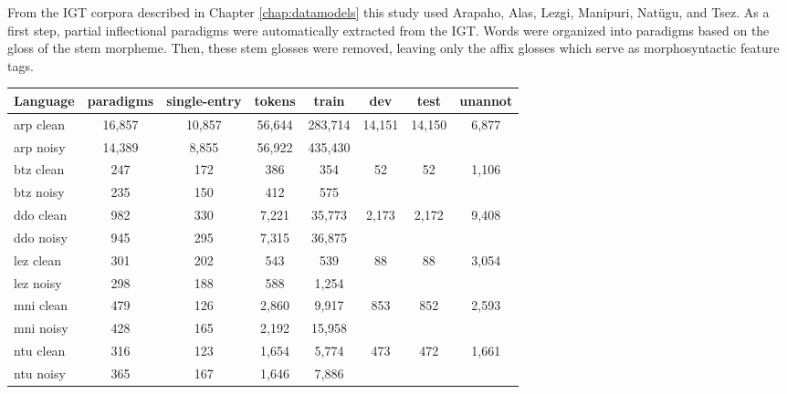 From the IGT corpora described in Chapter \ref{chap:datamodels} this study used Arapaho, Alas, Lezgi, Manipuri, Nat\"ugu, and Tsez.
As a first step, partial inflectional paradigms were automatically extracted from the IGT. Words were organized into paradigms based on the gloss of the stem morpheme. Then, these stem glosses were removed, leaving only the affix glosses which serve as morphosyntactic feature tags. 

\begin{table}[]
    \centering
    \begin{tabular}{l|ccccccc}
       \textbf{Language} & \textbf{paradigms} & \textbf{single-entry} & \textbf{tokens} & \textbf{train} & \textbf{dev} & \textbf{test} & \textbf{unannot}  \\
       \hline
       arp clean & 16,857 & 10,857 & 56,644 & 283,714 & \multirow{2}{*}{14,151} & \multirow{2}{*}{14,150} & \multirow{2}{*}{6,877} \\
       arp noisy & 14,389 & 8,855 & 56,922 & 435,430 & & &  \\
       \hline
       btz clean & 247 & 172 & 386 & 354 & \multirow{2}{*}{52}  & \multirow{2}{*}{52} & \multirow{2}{*}{1,106} \\
       btz noisy & 235 & 150 & 412 & 575 & & & \\
       \hline
       ddo clean & 982 & 330 & 7,221 & 35,773 & \multirow{2}{*}{2,173} & \multirow{2}{*}{2,172} & \multirow{2}{*}{9,408} \\
       ddo noisy & 945 & 295 & 7,315 & 36,875 & & &  \\
       \hline
       lez clean & 301 & 202 & 543 & 539 & \multirow{2}{*}{88} & \multirow{2}{*}{88} & \multirow{2}{*}{3,054} \\
       lez noisy & 298 & 188 & 588 & 1,254 &  &  &  \\
       \hline
       mni clean & 479 & 126 & 2,860 & 9,917 & \multirow{2}{*}{853} & \multirow{2}{*}{852} & \multirow{2}{*}{2,593}\\
       mni noisy & 428 & 165 & 2,192 & 15,958 &  &  &  \\
       \hline
       ntu clean & 316 & 123 & 1,654 & 5,774 & \multirow{2}{*}{473} & \multirow{2}{*}{472} & \multirow{2}{*}{1,661} \\
       ntu noisy & 365 & 167 & 1,646 & 7,886 &  &  &  \\
     

\end{tabular}
\end{table}
